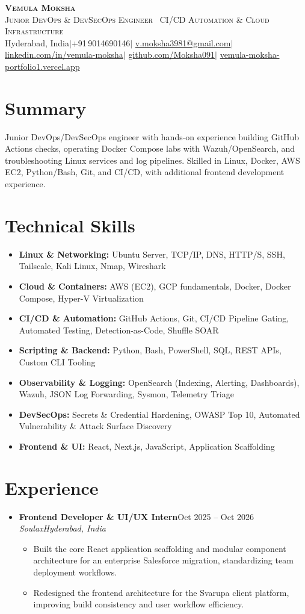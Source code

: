 \documentclass[letterpaper,10.5pt]{article}
\newcommand{\resumeItem}[1]{\item\small{#1\vspace{-1pt}}}
\newcommand{\resumeSubheading}[4]{\vspace{1pt}\item
  \textbf{#1}\hfill{\small #2}\\
  \textit{\small #3}\hfill{\textit{\small #4}}\vspace{-5pt}}
\newcommand{\resumeSubHeadingListStart}{\begin{itemize}[leftmargin=0.15in,label={}]}
\newcommand{\resumeSubHeadingListEnd}{\end{itemize}\vspace{-4pt}}
\newcommand{\resumeItemListStart}{\begin{itemize}[leftmargin=0.20in,itemsep=1pt,topsep=2pt]}
\newcommand{\resumeItemListEnd}{\end{itemize}\vspace{-3pt}}
\newcommand{\skillrow}[2]{\item[]\small\textbf{#1:} #2}
\begin{document}
\begin{center}
  {\Huge\scshape\textbf{Vemula Moksha}}\\[4pt]
  {\normalsize\scshape Junior DevOps \& DevSecOps Engineer \textbullet\ CI/CD Automation \& Cloud Infrastructure}\\[3pt]
  \small
  Hyderabad, India\;$|$\;+91\,9014690146\;$|$\;
  \href{mailto:v.moksha3981@gmail.com}{v.moksha3981@gmail.com}\;$|$\;
  \href{https://linkedin.com/in/vemula-moksha}{linkedin.com/in/vemula-moksha}\;$|$\;
  \href{https://github.com/Moksha091}{github.com/Moksha091}\;$|$\;
  \href{https://vemula-moksha-portfolio1.vercel.app}{vemula-moksha-portfolio1.vercel.app}
\end{center}
\vspace{-4pt}

\section{Summary}
\small
Junior DevOps/DevSecOps engineer with hands-on experience building GitHub Actions checks, operating Docker Compose labs with Wazuh/OpenSearch, and troubleshooting Linux services and log pipelines. Skilled in Linux, Docker, AWS EC2, Python/Bash, Git, and CI/CD, with additional frontend development experience.

\section{Technical Skills}
\begin{itemize}[leftmargin=0.15in, label={}, itemsep=1.5pt, topsep=2pt]
  \skillrow{Linux \& Networking}{Ubuntu Server, TCP/IP, DNS, HTTP/S, SSH, Tailscale, Kali Linux, Nmap, Wireshark}
  \skillrow{Cloud \& Containers}{AWS (EC2), GCP fundamentals, Docker, Docker Compose, Hyper-V Virtualization}
  \skillrow{CI/CD \& Automation}{GitHub Actions, Git, CI/CD Pipeline Gating, Automated Testing, Detection-as-Code, Shuffle SOAR}
  \skillrow{Scripting \& Backend}{Python, Bash, PowerShell, SQL, REST APIs, Custom CLI Tooling}
  \skillrow{Observability \& Logging}{OpenSearch (Indexing, Alerting, Dashboards), Wazuh, JSON Log Forwarding, Sysmon, Telemetry Triage}
  \skillrow{DevSecOps}{Secrets \& Credential Hardening, OWASP Top 10, Automated Vulnerability \& Attack Surface Discovery}
  \skillrow{Frontend \& UI}{React, Next.js, JavaScript, Application Scaffolding}
\end{itemize}
\vspace{-4pt}

\section{Experience}
\resumeSubHeadingListStart
  \resumeSubheading{Frontend Developer \& UI/UX Intern}{Oct 2025 -- Oct 2026}{Soulax}{Hyderabad, India}
  \resumeItemListStart
    \resumeItem{Built the core React application scaffolding and modular component architecture for an enterprise Salesforce migration, standardizing team deployment workflows.}
    \resumeItem{Redesigned the frontend architecture for the Svarupa client platform, improving build consistency and user workflow efficiency.}
  \resumeItemListEnd
\resumeSubHeadingListEnd
\end{document}
